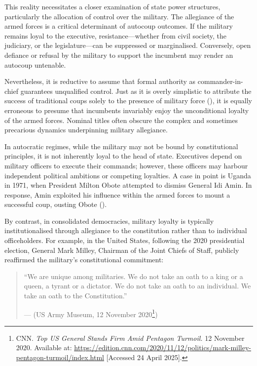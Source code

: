 \documentclass[
  12pt,
]{report}
\begin{document}
This reality necessitates a closer examination of state power
structures, particularly the allocation of control over the military.
The allegiance of the armed forces is a critical determinant of autocoup
outcomes. If the military remains loyal to the executive,
resistance---whether from civil society, the judiciary, or the
legislature---can be suppressed or marginalised. Conversely, open
defiance or refusal by the military to support the incumbent may render
an autocoup untenable.

Nevertheless, it is reductive to assume that formal authority as
commander-in-chief guarantees unqualified control. Just as it is overly
simplistic to attribute the success of traditional coups solely to the
presence of military force (), it is
equally erroneous to presume that incumbents invariably enjoy the
unconditional loyalty of the armed forces. Nominal titles often obscure
the complex and sometimes precarious dynamics underpinning military
allegiance.

In autocratic regimes, while the military may not be bound by
constitutional principles, it is not inherently loyal to the head of
state. Executives depend on military officers to execute their commands;
however, these officers may harbour independent political ambitions or
competing loyalties. A case in point is Uganda in 1971, when President
Milton Obote attempted to dismiss General Idi Amin. In response, Amin
exploited his influence within the armed forces to mount a successful
coup, ousting Obote ().

By contrast, in consolidated democracies, military loyalty is typically
institutionalised through allegiance to the constitution rather than to
individual officeholders. For example, in the United States, following
the 2020 presidential election, General Mark Milley, Chairman of the
Joint Chiefs of Staff, publicly reaffirmed the military's constitutional
commitment:

\begin{quote}
``We are unique among militaries. We do not take an oath to a king or a
queen, a tyrant or a dictator. We do not take an oath to an individual.
We take an oath to the Constitution.''

--- (US Army Museum, 12 November 2020\footnote{CNN. \emph{Top US General
  Stands Firm Amid Pentagon Turmoil.} 12 November 2020. Available at:
  \url{https://edition.cnn.com/2020/11/12/politics/mark-milley-pentagon-turmoil/index.html}
  {[}Accessed 24 April 2025{]}.})
\end{quote}
\end{document}
